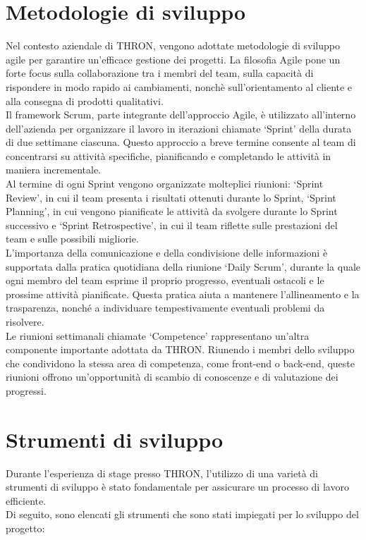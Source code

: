 \section{Metodologie di sviluppo}
Nel contesto aziendale di THRON, vengono adottate metodologie di sviluppo agile per garantire un'efficace
gestione dei progetti. La filosofia Agile pone un forte focus sulla collaborazione tra i membri del team,
sulla capacità di rispondere in modo rapido ai cambiamenti, nonchè sull'orientamento al cliente e alla consegna di prodotti qualitativi.\\
Il framework Scrum, parte integrante dell'approccio Agile, è utilizzato all'interno dell'azienda per organizzare il lavoro in iterazioni chiamate
`Sprint' della durata di due settimane ciascuna. Questo approccio a breve termine consente al team di concentrarsi su attività specifiche, pianificando
e completando le attività in maniera incrementale.\\
Al termine di ogni Sprint vengono organizzate molteplici riunioni: `Sprint Review', in cui il team presenta i risultati ottenuti durante lo Sprint,
`Sprint Planning', in cui vengono pianificate le attività da svolgere durante lo Sprint successivo e `Sprint Retrospective', in cui il team riflette sulle prestazioni del team e sulle possibili migliorie.\\
L'importanza della comunicazione e della condivisione delle informazioni è supportata dalla pratica quotidiana della riunione `Daily Scrum', durante la quale
ogni membro del team esprime il proprio progresso, eventuali ostacoli e le prossime attività pianificate. Questa pratica aiuta a mantenere l'allineamento e
la trasparenza, nonché a individuare tempestivamente eventuali problemi da risolvere.\\
Le riunioni settimanali chiamate `Competence' rappresentano un'altra componente importante adottata da THRON. Riunendo i membri dello sviluppo 
che condividono la stessa area di competenza, come front-end o back-end, queste riunioni offrono un'opportunità di scambio di conoscenze e di valutazione dei progressi.
\section{Strumenti di sviluppo}
Durante l'esperienza di stage presso THRON, l'utilizzo di una varietà di strumenti di sviluppo è stato fondamentale per assicurare un processo di lavoro efficiente.\\
Di seguito, sono elencati gli strumenti che sono stati impiegati per lo sviluppo del progetto:

